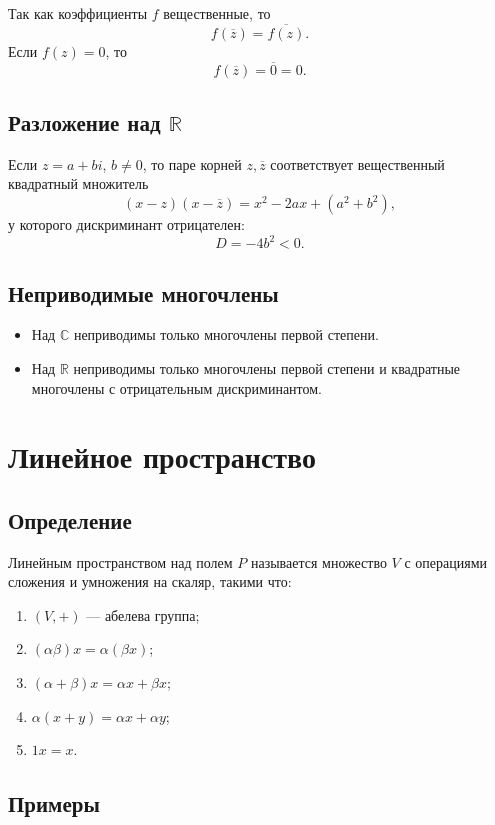 \documentclass[12pt,a4paper]{article}
\newcommand{\R}{\mathbb{R}}
\renewcommand{\C}{\mathbb{C}}
\begin{document}
Так как коэффициенты $f$ вещественные, то
\[
    f(\overline z)=\overline{f(z)}.
\]
Если $f(z)=0$, то
\[
    f(\overline z)=\overline 0=0.
\]

\subsection*{Разложение над $\R$}

Если $z=a+bi$, $b\ne0$, то паре корней $z,\overline z$ соответствует вещественный квадратный множитель
\[
    (x-z)(x-\overline z)=x^2-2ax+(a^2+b^2),
\]
у которого дискриминант отрицателен:
\[
    D=-4b^2<0.
\]

\subsection*{Неприводимые многочлены}

\begin{itemize}
    \item Над $\C$ неприводимы только многочлены первой степени.
    \item Над $\R$ неприводимы только многочлены первой степени и квадратные многочлены с отрицательным дискриминантом.
\end{itemize}

\section{Линейное пространство}

\subsection*{Определение}

Линейным пространством над полем $P$ называется множество $V$ с операциями сложения и умножения на скаляр, такими что:
\begin{enumerate}
    \item $(V,+)$ --- абелева группа;
    \item $(\alpha\beta)x=\alpha(\beta x)$;
    \item $(\alpha+\beta)x=\alpha x+\beta x$;
    \item $\alpha(x+y)=\alpha x+\alpha y$;
    \item $1x=x$.
\end{enumerate}

\subsection*{Примеры}
\end{document}
